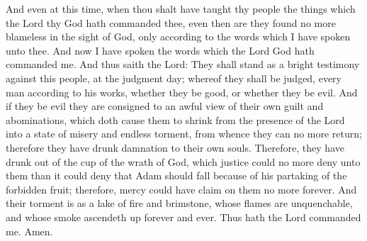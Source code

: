 And even at this time, when thou shalt have taught thy people the things which the Lord thy God hath commanded thee, even then are they found no more blameless in the sight of God, only according to the words which I have spoken unto thee.
\bverse \iffalse And now I have spoken the words which the Lord God hath commanded me. \fi
And now I have spoken the words which the Lord God hath commanded me.
\bverse \iffalse And thus saith the Lord: They shall stand as a bright testimony against this people, at the judgment day; whereof they shall be judged, every man according to his works, whether they be good, or whether they be evil. \fi
And thus saith the Lord: They shall stand as a bright testimony against this people, at the judgment day; whereof they shall be judged, every man according to his works, whether they be good, or whether they be evil.
\bverse \iffalse And if they be evil they are consigned to an awful view of their own guilt and abominations, which doth cause them to shrink from the presence of the Lord into a state of misery and endless torment, from whence they can no more return; therefore they have drunk damnation to their own souls. \fi
And if they be evil they are consigned to an awful view of their own guilt and abominations, which doth cause them to shrink from the presence of the Lord into a state of misery and endless torment, from whence they can no more return; therefore they have drunk damnation to their own souls.
\bverse \iffalse Therefore, they have drunk out of the cup of the wrath of God, which justice could no more deny unto them than it could deny that Adam should fall because of his partaking of the forbidden fruit; therefore, mercy could have claim on them no more forever. \fi
Therefore, they have drunk out of the cup of the wrath of God, which justice could no more deny unto them than it could deny that Adam should fall because of his partaking of the forbidden fruit; therefore, mercy could have claim on them no more forever.
\bverse \iffalse And their torment is as a lake of fire and brimstone, whose flames are unquenchable, and whose smoke ascendeth up forever and ever. Thus hath the Lord commanded me. Amen. \fi
And their torment is as a lake of fire and brimstone, whose flames are unquenchable, and whose smoke ascendeth up forever and ever. Thus hath the Lord commanded me. Amen.

